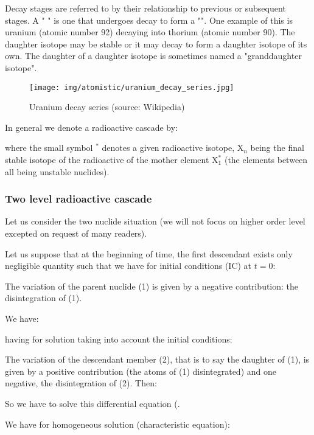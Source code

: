 	Decay stages are referred to by their relationship to previous or subsequent stages. A " " is one that undergoes decay to form a "". One example of this is uranium (atomic number 92) decaying into thorium (atomic number 90). The daughter isotope may be stable or it may decay to form a daughter isotope of its own. The daughter of a daughter isotope is sometimes named a "granddaughter isotope".
	
	\begin{figure}[H]
		\centering
		\texttt{[image: img/atomistic/uranium\_decay\_series.jpg]}	
		\caption[Uranium decay series]{Uranium decay series (source: Wikipedia)}
	\end{figure}
	
	In general we denote a radioactive cascade by:
	
	where the small symbol $^{*}$ denotes a given radioactive isotope, $\mathrm{X}_n$ being the final stable isotope of the radioactive of the mother element $\mathrm{X}_1^{*}$ (the elements between all being unstable nuclides).
	
	\subsubsection{Two level radioactive cascade}
	Let us consider the two nuclide situation (we will not focus on higher order level excepted on request of many readers). 

	Let us suppose that at the beginning of time, the first descendant exists only negligible quantity such that we have for initial conditions (IC) at $t=0$:
	
	The variation of the parent nuclide (1) is given by a negative contribution: the disintegration of (1).

	We have:
	
	having for solution taking into account the initial conditions:
	
	
	The variation of the descendant member (2), that is to say the daughter of (1), is given by a positive contribution (the atoms of (1) disintegrated) and one negative, the disintegration of (2). Then:
	
	So we have to solve this differential equation (.
	
	We have for homogeneous solution (characteristic equation):
	
